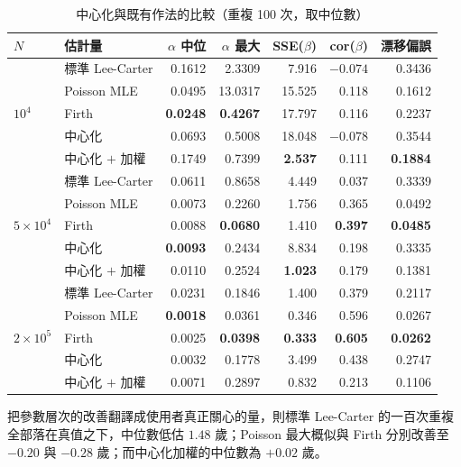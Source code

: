 \documentclass[UTF8, fontset=macnew, a4paper, 12pt]{ctexart}
\begin{document}
\begin{table}[H]
\centering
\caption{中心化與既有作法的比較（重複 100 次，取中位數）}
\footnotesize
\begin{tabular}{llrrrrr}
\toprule
$N$ & 估計量 & $\alpha$ 中位 & $\alpha$ 最大 & SSE($\beta$) & cor($\beta$) & 漂移偏誤\\
\midrule
\multirow{5}{*}{$10^4$}
 & 標準 Lee-Carter          & 0.1612 & 2.3309 & 7.916 & $-0.074$ & 0.3436\\
 & Poisson MLE       & 0.0495 & 13.0317 & 15.525 & 0.118 & 0.1612\\
 & Firth            & \textbf{0.0248} & \textbf{0.4267} & 17.797 & 0.116 & 0.2237\\
 & 中心化           & 0.0693 & 0.5008 & 18.048 & $-0.078$ & 0.3544\\
 & 中心化 $+$ 加權   & 0.1749 & 0.7399 & \textbf{2.537} & 0.111 & \textbf{0.1884}\\
\midrule
\multirow{5}{*}{$5\times10^4$}
 & 標準 Lee-Carter          & 0.0611 & 0.8658 & 4.449 & 0.037 & 0.3339\\
 & Poisson MLE       & 0.0073 & 0.2260 & 1.756 & 0.365 & 0.0492\\
 & Firth            & 0.0088 & \textbf{0.0680} & 1.410 & \textbf{0.397} & \textbf{0.0485}\\
 & 中心化           & \textbf{0.0093} & 0.2434 & 8.834 & 0.198 & 0.3335\\
 & 中心化 $+$ 加權   & 0.0110 & 0.2524 & \textbf{1.023} & 0.179 & 0.1381\\
\midrule
\multirow{5}{*}{$2\times10^5$}
 & 標準 Lee-Carter          & 0.0231 & 0.1846 & 1.400 & 0.379 & 0.2117\\
 & Poisson MLE       & \textbf{0.0018} & 0.0361 & 0.346 & 0.596 & 0.0267\\
 & Firth            & 0.0025 & \textbf{0.0398} & \textbf{0.333} & \textbf{0.605} & \textbf{0.0262}\\
 & 中心化           & 0.0032 & 0.1778 & 3.499 & 0.438 & 0.2747\\
 & 中心化 $+$ 加權   & 0.0071 & 0.2897 & 0.832 & 0.213 & 0.1106\\
\bottomrule
\end{tabular}
\label{tab:estcmp}
\end{table}



把參數層次的改善翻譯成使用者真正關心的量，則標準 Lee-Carter 的一百次重複
全部落在真值之下，中位數低估 $1.48$ 歲；Poisson 最大概似與 Firth 分別改善至
$-0.20$ 與 $-0.28$ 歲；而中心化加權的中位數為 $+0.02$ 歲。
\end{document}
